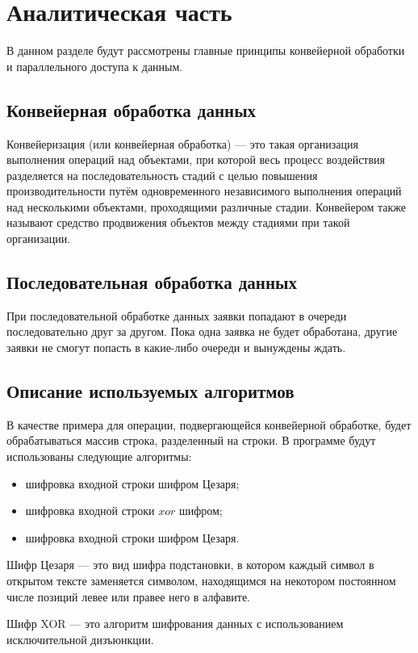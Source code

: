 \chapter{Аналитическая часть}

В данном разделе будут рассмотрены главные принципы конвейерной обработки и параллельного доступа к данным.

\section{Конвейерная обработка данных}
Конвейеризация (или конвейерная обработка) --- это такая организация выполнения операций над объектами, при которой весь процесс воздействия разделяется на последовательность стадий с целью повышения производительности путём одновременного независимого выполнения операций над несколькими объектами, проходящими различные стадии. Конвейером также называют средство продвижения объектов между стадиями при такой организации.

\section{Последовательная обработка данных}
При последовательной обработке данных заявки попадают в очереди последовательно друг за другом. Пока одна заявка не будет обработана, другие заявки не смогут попасть в какие-либо очереди и вынуждены ждать.

\section{Описание используемых алгоритмов}
В качестве примера для операции, подвергающейся конвейерной обработке, будет обрабатываться массив строка, разделенный на строки. 
\newpage
В программе будут использованы следующие алгоритмы:
\begin{itemize}
	\item шифровка входной строки шифром Цезаря;
\item шифровка входной строки $xor$ шифром;
\item шифровка входной строки шифром Цезаря.
\end{itemize} 

Шифр Цезаря --- это вид шифра подстановки, в котором каждый символ в открытом тексте заменяется символом, находящимся на некотором постоянном числе позиций левее или правее него в алфавите.

Шифр XOR --- это алгоритм шифрования данных с использованием исключительной дизъюнкции.

